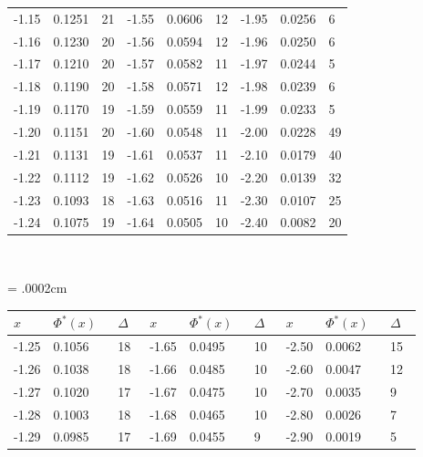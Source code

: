 \documentclass[russian, 12pt, fleqn]{article}
\begin{document}
\begin{center}
\begin{tabular}[b]{ | l | l |  l || l | l | l || l | l |  l |  }
-1.15&0.1251&21&-1.55&0.0606&12&-1.95&0.0256&6\\%
-1.16&0.1230&20&-1.56&0.0594&12&-1.96&0.0250&6\\%
-1.17&0.1210&20&-1.57&0.0582&11&-1.97&0.0244&5 \\%
-1.18&0.1190&20&-1.58&0.0571&12&-1.98&0.0239&6 \\%
-1.19&0.1170&19&-1.59&0.0559&11&-1.99&0.0233&5 \\%
%
-1.20&0.1151&20&-1.60&0.0548&11&-2.00&0.0228&49 \\%
-1.21&0.1131&19&-1.61&0.0537&11&-2.10&0.0179&40\\%
-1.22&0.1112&19&-1.62&0.0526&10&-2.20&0.0139&32 \\%
-1.23&0.1093&18&-1.63&0.0516&11&-2.30&0.0107&25 \\%
-1.24&0.1075&19&-1.64&0.0505&10&-2.40&0.0082&20 \\%
\hline
\end{tabular}\\
\end{center}
\newpage
\newdimen \colwidth \colwidth = .0002cm
\noindent 
\begin{center}
\begin{tabular}[b]{ | l | l | l || l | l | l || l | l | l |   }
\hline
$x\ \ \ \ \ $&$\Phi^*(x)\ \ \ $&$\Delta\ \ \ $&$x\ \ \ \ \ $&$\Phi^*(x)\ \ \ $&$\Delta\ \ \ $&$x\ \ \ \ \ $&$\Phi^*(x)\ \ \ $&$\Delta\ \ \ $\\
\hline
-1.25&0.1056&18&-1.65&0.0495&10&-2.50&0.0062&15 \\%
-1.26&0.1038&18&-1.66&0.0485&10&-2.60&0.0047&12 \\%
-1.27&0.1020&17&-1.67&0.0475&10&-2.70&0.0035&9   \\%
-1.28&0.1003&18&-1.68&0.0465&10&-2.80&0.0026&7   \\%
-1.29&0.0985&17&-1.69&0.0455&9  &-2.90&0.0019&5   \\%
\hline
\end{tabular}
\end{center}
\noindent 
\end{document}
